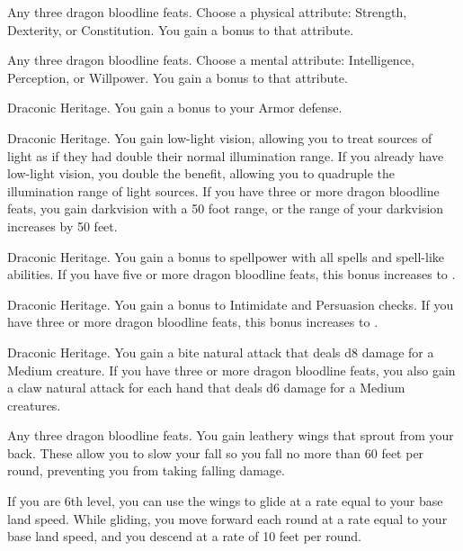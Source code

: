 \featpre Any three dragon bloodline feats.
\featben Choose a physical attribute: Strength, Dexterity, or Constitution.
You gain a  bonus to that attribute.

\featpre Any three dragon bloodline feats.
\featben Choose a mental attribute: Intelligence, Perception, or Willpower.
You gain a  bonus to that attribute.

\featpre Draconic Heritage.
\featben You gain a  bonus to your Armor defense.

\featpre Draconic Heritage.
\featben You gain low-light vision, allowing you to treat sources of light as if they had double their normal illumination range.
If you already have low-light vision, you double the benefit, allowing you to quadruple the illumination range of light sources.
If you have three or more dragon bloodline feats, you gain darkvision with a 50 foot range, or the range of your darkvision increases by 50 feet.

\featpre Draconic Heritage.
\featben You gain a  bonus to spellpower with all spells and spell-like abilities.
If you have five or more dragon bloodline feats, this bonus increases to .

\featpre Draconic Heritage.
\featben You gain a  bonus to Intimidate and Persuasion checks.
If you have three or more dragon bloodline feats, this bonus increases to .

\featpre Draconic Heritage.
\featben You gain a bite natural attack that deals d8 damage for a Medium creature.
If you have three or more dragon bloodline feats, you also gain a claw natural attack for each hand that deals d6 damage for a Medium creatures.

\featpre Any three dragon bloodline feats.
\featben You gain leathery wings that sprout from your back.
These allow you to slow your fall so you fall no more than 60 feet per round, preventing you from taking falling damage.

If you are 6th level, you can use the wings to glide at a rate equal to your base land speed.
While gliding, you move forward each round at a rate equal to your base land speed, and you descend at a rate of 10 feet per round.

